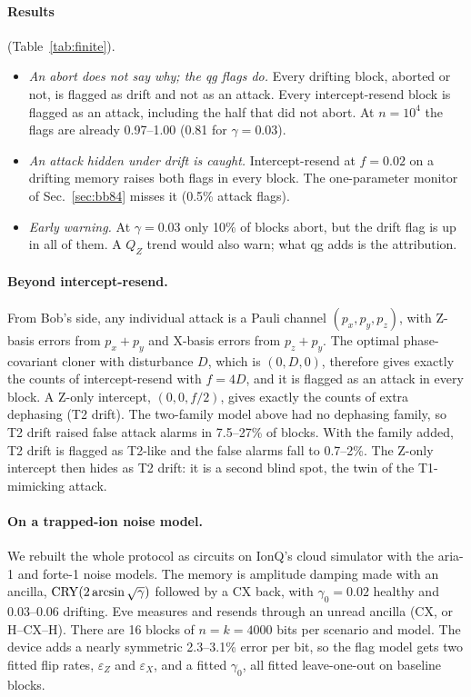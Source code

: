 \documentclass[11pt]{article}
\begin{document}
\paragraph{Results} (Table~\ref{tab:finite}).
\begin{itemize}
\item \emph{An abort does not say why; the qg flags do.} Every drifting block, aborted or not, is
flagged as drift and not as an attack. Every intercept-resend block is flagged as an attack,
including the half that did not abort. At $n=10^4$ the flags are already 0.97--1.00 (0.81 for
$\gamma=0.03$).
\item \emph{An attack hidden under drift is caught.} Intercept-resend at $f=0.02$ on a drifting
memory raises both flags in every block. The one-parameter monitor of Sec.~\ref{sec:bb84} misses
it (0.5\% attack flags).
\item \emph{Early warning.} At $\gamma=0.03$ only 10\% of blocks abort, but the drift flag is up in
all of them. A $Q_Z$ trend would also warn; what qg adds is the attribution.
\end{itemize}

\paragraph{Beyond intercept-resend.} From Bob's side, any individual attack is a Pauli channel
$(p_x,p_y,p_z)$, with Z-basis errors from $p_x+p_y$ and X-basis errors from $p_z+p_y$. The optimal
phase-covariant cloner with disturbance $D$, which is $(0,D,0)$, therefore gives exactly the counts of
intercept-resend with $f=4D$, and it is flagged as an attack in every block. A Z-only intercept,
$(0,0,f/2)$, gives exactly the counts of extra dephasing (T2 drift). The two-family model above had no
dephasing family, so T2 drift raised false attack alarms in 7.5--27\% of blocks. With the family added,
T2 drift is flagged as T2-like and the false alarms fall to 0.7--2\%. The Z-only intercept then hides as
T2 drift: it is a second blind spot, the twin of the T1-mimicking attack.

\paragraph{On a trapped-ion noise model.} We rebuilt the whole protocol as circuits on IonQ's cloud
simulator with the aria-1 and forte-1 noise models. The memory is amplitude damping made with an
ancilla, ${\rm CRY}(2\arcsin\sqrt\gamma)$ followed by a CX back, with $\gamma_0=0.02$ healthy and
0.03--0.06 drifting. Eve measures and resends through an unread ancilla (CX, or H--CX--H). There
are 16 blocks of $n=k=4000$ bits per scenario and model. The device adds a nearly symmetric 2.3--3.1\%
error per bit, so the flag model gets two fitted flip rates, $\varepsilon_Z$ and $\varepsilon_X$, and a
fitted $\gamma_0$, all fitted leave-one-out on baseline blocks.
\end{document}

